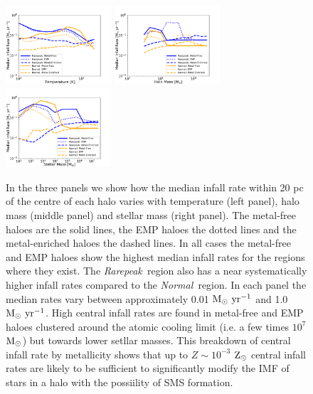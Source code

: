 \documentclass[twocolumn,iop,revtex4]{openjournal}
\newcommand{\msolarc} {$\rm{M_{\odot}}$}
\newcommand{\msolaryr} {$\rm{M_{\odot}~yr^{-1}}~$}
\newcommand{\msolaryrc} {$\rm{M_{\odot}~yr^{-1}}$}
\newcommand{\zsolar} {$\rm{Z_{\odot}}~$}
\newcommand{\rarepeak} {\textit{Rarepeak~}}
\newcommand{\normal} {\textit{Normal~}}
\begin{document}
\begin{figure}
\centering
\begin{minipage}{175mm}      \begin{center} 
\centerline{
\includegraphics[width=0.35\textwidth]{FIGURES/BinnedTemperature.pdf}
\includegraphics[width=0.35\textwidth]{FIGURES/BinnedHaloMass.pdf}
\includegraphics[width=0.35\textwidth]{FIGURES/BinnedStellarMass.pdf}}
\caption{In the three panels we show how the median infall rate within 20 pc of the centre of each halo
  varies with temperature (left panel), halo mass (middle panel) and stellar mass (right panel). The metal-free
  haloes are the solid lines, the EMP haloes the dotted lines and the metal-enriched haloes the dashed lines.
  In all cases the metal-free and EMP haloes show the highest median infall rates for the regions where they
  exist. The \rarepeak region also has a near systematically higher infall rates compared to the \normal region.
  In each panel the median rates vary between approximately 0.01 \msolaryr and 1.0 \msolaryrc. High
  central infall rates are found in metal-free and EMP haloes clustered around the atomic cooling limit (i.e.
  a few times $10^7$ \msolarc) but towards lower setllar masses. This breakdown of central infall rate
  by metallicity shows that up to $Z \sim 10^{-3}$ \zsolar central infall rates are likely to be sufficient
  to significantly modify the IMF of stars in a halo with the possiility of SMS formation.
 \label{Fig:BinnedMedianInfall}}
\end{center} \end{minipage}

\end{figure}
\end{document}
